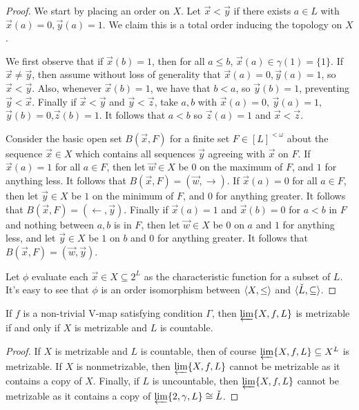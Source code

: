 \documentclass[11pt]{article}
\newcommand{\vect}{\vec}
\begin{document}
  \begin{proof}
    We start by placing an order on \(X\). Let \(\vect x<\vect y\) if
    there exists \(a\in L\) with \(\vect x(a)=0,\vect y(a)=1\). We claim this is
    a total order inducing the topology on \(X\).

    We first observe that if \(\vect x(b)=1\), then for all \(a\leq b\),
    \(\vect x(a)\in\gamma(1)=\{1\}\). If \(\vect x\not=\vect y\), then assume
    without loss of generality that \(\vect x(a)=0,\vect y(a)=1\), so
    \(\vect x<\vect y\). Also, whenever \(\vect x(b)=1\), we have that \(b<a\),
    so \(\vect y(b)=1\), preventing \(\vect y<\vect x\). Finally if
    \(\vect x<\vect y\) and \(\vect y<\vect z\), take \(a,b\) with
    \(\vect x(a)=0\), \(\vect y(a)=1\),\(\vect y(b)=0\),\(\vect z(b)=1\). It
    follows that \(a<b\) so \(\vect z(a)=1\) and \(\vect x<\vect z\).

    Consider the basic open set \(B(\vect x,F)\) for a finite set
    \(F\in [L]^{<\omega}\)
    about the sequence \(\vect x\in X\) which contains all sequences
    \(\vect y\) agreeing with \(\vect x\) on \(F\). If \(\vect x(a)=1\) for all
    \(a\in F\), then let \(\vect w\in X\) be \(0\) on the maximum of \(F\),
    and \(1\) for anything less. It follows that
    \(B(\vect x,F)=(\vect w,\rightarrow)\). If \(\vect x(a)=0\) for all
    \(a\in F\), then let \(\vect y\in X\) be \(1\) on the minimum of \(F\),
    and \(0\) for anything greater. It follows that
    \(B(\vect x,F)=(\leftarrow,\vect y)\). Finally if \(\vect x(a)=1\) and
    \(\vect x(b)=0\) for \(a<b\) in \(F\) and nothing between \(a,b\) is in
    \(F\), then let \(\vect w\in X\) be \(0\) on \(a\)
    and \(1\) for anything less, and let \(\vect y\in X\) be \(1\) on \(b\)
    and \(0\) for anything greater. It follows that
    \(B(\vect x,F)=(\vect w,\vect y)\).

    Let \(\phi\) evaluate each \(\vect x\in X\subseteq 2^L\) as the
    characteristic function for a subset of \(L\). It's easy to see that
    \(\phi\) is an order isomorphism between \(\langle X,\leq\rangle\) and
    \(\langle\check L,\subseteq\rangle\).
  \end{proof}

  \begin{corollary}
    If \(f\) is a non-trivial V-map satisfying condition \(\Gamma\), then
    \(\varprojlim \{X, f, L\}\) is metrizable if and only if
    \(X\) is metrizable and \(L\) is countable.
  \end{corollary}

  \begin{proof}
    If \(X\) is metrizable and \(L\) is countable, then of course
    \(\varprojlim \{X,f,L\}\subseteq X^L\) is metrizable. If \(X\) is
    nonmetrizable, then \(\varprojlim \{X,f,L\}\) cannot be metrizable
    as it contains a copy of \(X\). Finally, if \(L\) is uncountable,
    then \(\varprojlim \{X,f,L\}\) cannot be metrizable as it
    contains a copy of \(\varprojlim \{2,\gamma,L\}\cong\check L\).
  \end{proof}
\end{document}
